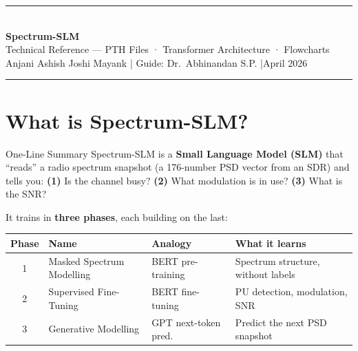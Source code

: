 \documentclass[11pt,a4paper]{article}
\begin{document}

\begin{center}
  {\color{Blue}\rule{\textwidth}{2pt}}\\[6pt]
  {\Huge\bfseries\sffamily Spectrum-SLM}\\[4pt]
  {\large\sffamily\color{Gray} Technical Reference — PTH Files · Transformer Architecture · Flowcharts}\\[6pt]
  {\small\sffamily Anjani \textbullet{} Ashish Joshi \textbullet{} Mayank \quad|\quad
   Guide: Dr.~Abhinandan S.P. \quad|\quad April 2026}\\[6pt]
  {\color{Blue}\rule{\textwidth}{1pt}}
\end{center}

\tableofcontents
\vspace{1em}

\section{What is Spectrum-SLM?}

\begin{idea}{One-Line Summary}
Spectrum-SLM is a \textbf{Small Language Model (SLM)} that ``reads'' a radio
spectrum snapshot (a 176-number PSD vector from an SDR) and tells you:
\textbf{(1)} Is the channel busy?  \textbf{(2)} What modulation is in use?
\textbf{(3)} What is the SNR?
\end{idea}

\noindent It trains in \textbf{three phases}, each building on the last:

\begin{center}
\begin{tabular}{clll}
\toprule
\textbf{Phase} & \textbf{Name} & \textbf{Analogy} & \textbf{What it learns} \\
\midrule
1 & Masked Spectrum Modelling & BERT pre-training   & Spectrum structure, without labels \\
2 & Supervised Fine-Tuning    & BERT fine-tuning     & PU detection, modulation, SNR \\
3 & Generative Modelling      & GPT next-token pred. & Predict the next PSD snapshot \\
\bottomrule
\end{tabular}
\end{center}
\end{document}
